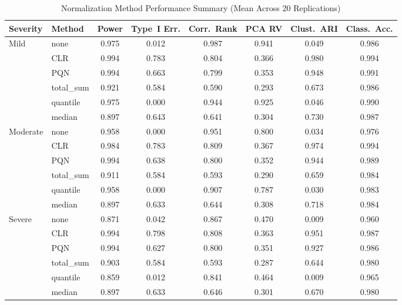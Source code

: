 \documentclass[12pt]{article}
\begin{document}
\begin{table}[ht!]
\centering
\caption{Normalization Method Performance Summary (Mean Across 20 Replications)}
\label{tab:norm_performance}
\small
\begin{tabular}{llcccccc}
\toprule
Severity & Method & Power & Type~I Err. & Corr.\ Rank & PCA RV & Clust.\ ARI & Class.\ Acc. \\
\midrule
\multirow{6}{*}{Mild}
 & none & 0.975 & 0.012 & 0.987 & 0.941 & 0.049 & 0.986 \\
 & CLR & 0.994 & 0.783 & 0.804 & 0.366 & 0.980 & 0.994 \\
 & PQN & 0.994 & 0.663 & 0.799 & 0.353 & 0.948 & 0.991 \\
 & total\_sum & 0.921 & 0.584 & 0.590 & 0.293 & 0.673 & 0.986 \\
 & quantile & 0.975 & 0.000 & 0.944 & 0.925 & 0.046 & 0.990 \\
 & median & 0.897 & 0.643 & 0.641 & 0.304 & 0.730 & 0.987 \\
\midrule
\multirow{6}{*}{Moderate}
 & none & 0.958 & 0.000 & 0.951 & 0.800 & 0.034 & 0.976 \\
 & CLR & 0.984 & 0.783 & 0.809 & 0.367 & 0.974 & 0.994 \\
 & PQN & 0.994 & 0.638 & 0.800 & 0.352 & 0.944 & 0.989 \\
 & total\_sum & 0.911 & 0.584 & 0.593 & 0.290 & 0.659 & 0.984 \\
 & quantile & 0.958 & 0.000 & 0.907 & 0.787 & 0.030 & 0.983 \\
 & median & 0.897 & 0.633 & 0.644 & 0.308 & 0.718 & 0.984 \\
\midrule
\multirow{6}{*}{Severe}
 & none & 0.871 & 0.042 & 0.867 & 0.470 & 0.009 & 0.960 \\
 & CLR & 0.994 & 0.798 & 0.808 & 0.363 & 0.951 & 0.987 \\
 & PQN & 0.994 & 0.627 & 0.800 & 0.351 & 0.927 & 0.986 \\
 & total\_sum & 0.903 & 0.584 & 0.593 & 0.287 & 0.644 & 0.980 \\
 & quantile & 0.859 & 0.012 & 0.841 & 0.464 & 0.009 & 0.965 \\
 & median & 0.897 & 0.633 & 0.646 & 0.301 & 0.670 & 0.980 \\
\bottomrule
\end{tabular}
\end{table}
\end{document}
